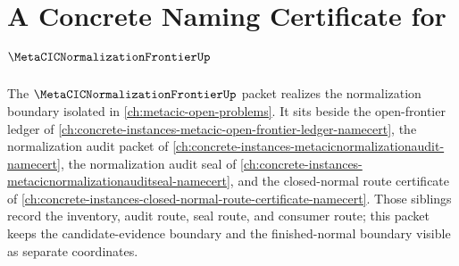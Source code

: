 \chapter{A Concrete Naming Certificate for $\MetaCICNormalizationFrontierUp$}
\label{ch:concrete-instances-metacicnormalizationfrontier-namecert}

The $\MetaCICNormalizationFrontierUp$ packet realizes the normalization boundary isolated in \autoref{ch:metacic-open-problems}. It sits beside the open-frontier ledger of \autoref{ch:concrete-instances-metacic-open-frontier-ledger-namecert}, the normalization audit packet of \autoref{ch:concrete-instances-metacicnormalizationaudit-namecert}, the normalization audit seal of \autoref{ch:concrete-instances-metacicnormalizationauditseal-namecert}, and the closed-normal route certificate of \autoref{ch:concrete-instances-closed-normal-route-certificate-namecert}. Those siblings record the inventory, audit route, seal route, and consumer route; this packet keeps the candidate-evidence boundary and the finished-normal boundary visible as separate coordinates.

















